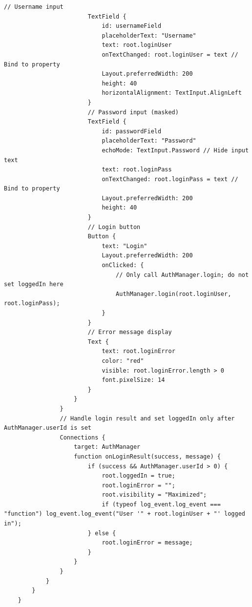 \documentclass{report}
\begin{document}
\begin{lstlisting}[style=qmlstyle]
                        // Username input
                        TextField {
                            id: usernameField
                            placeholderText: "Username"
                            text: root.loginUser
                            onTextChanged: root.loginUser = text // Bind to property
                            Layout.preferredWidth: 200
                            height: 40
                            horizontalAlignment: TextInput.AlignLeft
                        }
                        // Password input (masked)
                        TextField {
                            id: passwordField
                            placeholderText: "Password"
                            echoMode: TextInput.Password // Hide input text
                            text: root.loginPass
                            onTextChanged: root.loginPass = text // Bind to property
                            Layout.preferredWidth: 200
                            height: 40
                        }
                        // Login button
                        Button {
                            text: "Login"
                            Layout.preferredWidth: 200
                            onClicked: {
                                // Only call AuthManager.login; do not set loggedIn here
                                AuthManager.login(root.loginUser, root.loginPass);
                            }
                        }
                        // Error message display
                        Text {
                            text: root.loginError
                            color: "red"
                            visible: root.loginError.length > 0
                            font.pixelSize: 14
                        }
                    }
                }
                // Handle login result and set loggedIn only after AuthManager.userId is set
                Connections {
                    target: AuthManager
                    function onLoginResult(success, message) {
                        if (success && AuthManager.userId > 0) {
                            root.loggedIn = true;
                            root.loginError = "";
                            root.visibility = "Maximized";
                            if (typeof log_event.log_event === "function") log_event.log_event("User '" + root.loginUser + "' logged in");
                        } else {
                            root.loginError = message;
                        }
                    }
                }
            }
        }
    }


\end{lstlisting}
\end{document}
